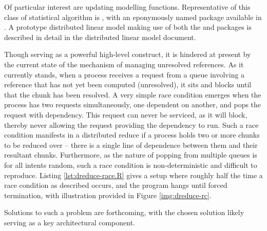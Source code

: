\documentclass[10pt, a4paper]{article}
\begin{document}
Of particular interest are updating modelling functions.
Representative of this class of statistical algorithm is , with an eponymously named package available in \R{}.
A prototype distributed linear model making use of both the  and \lsr{} packages is described in detail in the distributed linear model document.

Though serving as a powerful high-level construct, it is hindered at present by the current state of the \lsr{} mechanism of managing unresolved references.
As it currently stands, when a process receives a request from a queue involving a reference that has not yet been computed (unresolved), it sits and blocks until that the chunk has been resolved.
A very simple race condition emerges when the process has two requests simultaneously, one dependent on another, and pops the request with dependency.
This request can never be serviced, as it will block, thereby never allowing the request providing the dependency to run.
Such a race condition manifests in a distributed reduce if a process holds two or more chunks to be reduced over -- there is a single line of dependence between them and their resultant chunks.
Furthermore, as the nature of popping from multiple queues is for all intents random, such a race condition is non-deterministic and difficult to reproduce.
Listing \ref{lst:dreduce-race.R} gives a setup where roughly half the time a race condition as described occurs, and the program hangs until forced termination, with illustration provided in Figure \ref{img:dreduce-rc}.

Solutions to such a problem are forthcoming, with the chosen solution likely serving as a key architectural component.
\end{document}
